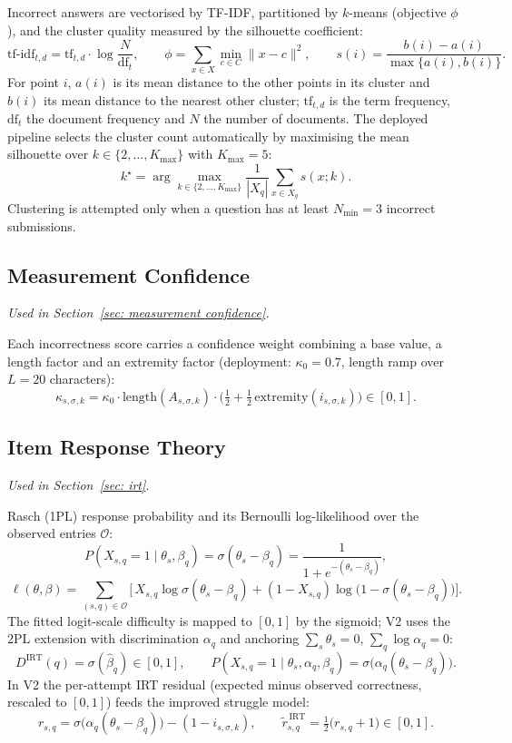 Incorrect answers are vectorised by TF-IDF, partitioned by $k$-means (objective $\phi$), and the cluster quality measured by the silhouette coefficient:
\[
    \mathrm{tf\text{-}idf}_{t,d} = \mathrm{tf}_{t,d}\cdot\log\frac{N}{\mathrm{df}_t},
    \qquad
    \phi = \sum_{x\in X}\min_{c\in C}\|x-c\|^2,
    \qquad
    s(i) = \frac{b(i)-a(i)}{\max\{a(i),b(i)\}}.
\]
For point $i$, $a(i)$ is its mean distance to the other points in its cluster and $b(i)$ its mean distance to the nearest other cluster; $\mathrm{tf}_{t,d}$ is the term frequency, $\mathrm{df}_t$ the document frequency and $N$ the number of documents.
The deployed pipeline selects the cluster count automatically by maximising the mean silhouette over $k\in\{2,\ldots,K_{\max}\}$ with $K_{\max}=5$:
\[
    k^\star = \arg\max_{k\in\{2,\ldots,K_{\max}\}} \frac{1}{|X_q|}\sum_{x\in X_q} s(x;k).
\]
Clustering is attempted only when a question has at least $N_{\min}=3$ incorrect submissions.

\subsection{Measurement Confidence}
\emph{Used in Section~\ref{sec: measurement confidence}.}

Each incorrectness score carries a confidence weight combining a base value, a length factor and an extremity factor (deployment: $\kappa_0 = 0.7$, length ramp over $L = 20$ characters):
\[
    \kappa_{s,\sigma,k}
    = \kappa_0 \cdot \mathrm{length}(A_{s,\sigma,k}) \cdot
      \Big(\tfrac{1}{2} + \tfrac{1}{2}\,\mathrm{extremity}(i_{s,\sigma,k})\Big) \in [0,1].
\]

\subsection{Item Response Theory}
\emph{Used in Section~\ref{sec: irt}.}

Rasch (1PL) response probability and its Bernoulli log-likelihood over the observed entries $\mathcal{O}$:
\[
    P(X_{s,q}=1 \mid \theta_s,\beta_q) = \sigma(\theta_s-\beta_q) = \frac{1}{1+e^{-(\theta_s-\beta_q)}},
\]
\[
    \ell(\theta,\beta)
    = \sum_{(s,q)\in\mathcal{O}}
      \big[\, X_{s,q}\log\sigma(\theta_s-\beta_q) + (1-X_{s,q})\log\big(1-\sigma(\theta_s-\beta_q)\big) \big].
\]
The fitted logit-scale difficulty is mapped to $[0,1]$ by the sigmoid; V2 uses the 2PL extension with discrimination $\alpha_q$ and anchoring $\sum_s\theta_s = 0$, $\sum_q\log\alpha_q = 0$:
\[
    D^{\mathrm{IRT}}(q) = \sigma(\hat{\beta}_q) \in [0,1],
    \qquad
    P(X_{s,q}=1 \mid \theta_s,\alpha_q,\beta_q) = \sigma\!\big(\alpha_q(\theta_s-\beta_q)\big).
\]
In V2 the per-attempt IRT residual (expected minus observed correctness, rescaled to $[0,1]$) feeds the improved struggle model:
\[
    r_{s,q} = \sigma\!\big(\alpha_q(\theta_s-\beta_q)\big) - (1 - i_{s,\sigma,k}),
    \qquad
    \tilde{r}^{\,\mathrm{IRT}}_{s,q} = \tfrac{1}{2}\big(r_{s,q} + 1\big) \in [0,1].
\]

